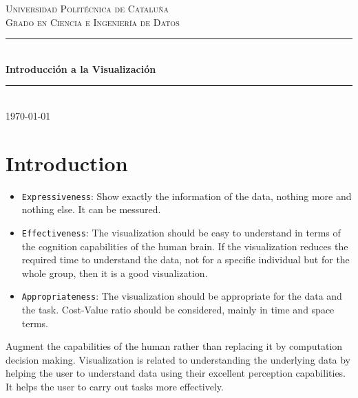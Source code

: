 \documentclass{article}
\begin{document}
\begin{titlepage}
    \newcommand{\HRule}{\rule{\linewidth}{0.5mm}}
    
    \center %
    \textsc{\LARGE Universidad Politécnica de Cataluña}\\[1.5cm]
    \textsc{\Large Grado en Ciencia e Ingeniería de Datos}\\[0.5cm]
    \HRule\\[0.4cm]
    {\huge\bfseries Introducción a la Visualización}\\[0.4cm]
    \HRule\\[1.5cm]
    \vfill
    {\large\today}
\end{titlepage}

\newpage
\tableofcontents
\newpage

\fancyfoot{} %

\section{Introduction}

\begin{itemize}
  \item \texttt{Expressiveness}: Show exactly the information of the data, nothing more and nothing else. It can be messured.
  \item \texttt{Effectiveness}: The visualization should be easy to understand in terms of the cognition capabilities of the human brain.  If the visualization reduces the required time to understand the data, not for a specific individual but for the whole group, then it is a good visualization.
  \item \texttt{Appropriateness}: The visualization should be appropriate for the data and the task. Cost-Value ratio should be considered, mainly in time and space terms.
\end{itemize}

\noindent
Augment the capabilities of the human rather than replacing it by computation decision making. Visualization is related to understanding the underlying data by helping the user to understand data using their excellent perception capabilities. It helps the user to carry out tasks more effectively.
\end{document}
